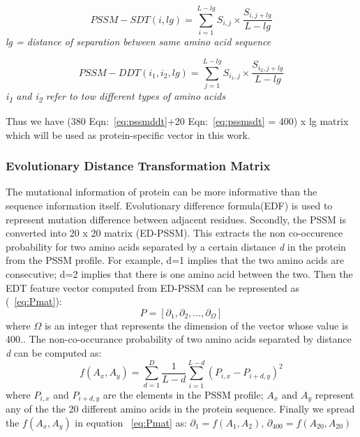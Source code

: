 \begin{equation}
  PSSM-SDT(i,lg) = \sum_{i=1}^{L-lg} S_{i,j} \times \frac{ S_{i,j+lg} }{L-lg} 
  \label{eq:pssmsdt}
\end{equation}
\textit{\center lg =  distance of separation between same amino acid sequence}

\begin{equation}
  PSSM-DDT(i_1,i_2, lg) = \sum_{j=1}^{L-lg} S_{i_1,j} \times \frac{ S_{i_2,j+lg} }{ L-lg} 
  \label{eq:pssmddt}
\end{equation}
\textit{\centering i\textsubscript{1} and i\textsubscript{2} refer to tow different types of amino acids}

Thus we have (380 Eqn:~\ref{eq:pssmddt}+20 Eqn:~\ref{eq:pssmsdt} = 400) x lg matrix which will be used as protein-specific vector in this work.

\subsubsection{Evolutionary Distance Transformation Matrix}
The mutational information of protein can be more informative than the sequence information itself\cite{Zhang2014}. Evolutionary difference formula(EDF) is used to represent mutation difference between adjacent residues. Secondly, the PSSM is converted into 20 x 20 matrix (ED-PSSM). This extracts the non co-occurence probability for two amino acids separated by a certain distance \textit{d} in the protein from the PSSM profile. For example, d=1 implies that the two amino acids are consecutive; d=2 implies that there is one amino acid between the two. Then the EDT feature vector computed from ED-PSSM can be represented as (~\ref{eq:Pmat}): 
\begin{equation}
  \label{eq:Pmat}
  P = [ \partial_1 ,\partial_2, \dots, \partial_\Omega]
\end{equation}
where $\Omega$ is an integer that represents the dimension of the vector whose value is 400.. The non-co-occurance probability of two amino acids separated by distance \textit{d} can be computed as:
\begin{equation}
  f(A_x,A_y) = \sum_{d=1}^{D} \frac{1}{L-d} \sum_{i=1}^{L-d} (P_{i,x} - P_{i+d,y})^2
  \label{eq:edt}
\end{equation}
where $P_{i,x}$ and $P_{i+d,y}$ are the elements in the PSSM profile; $A_x$ and $A_y$ represent any of the the 20 different amino acids in the protein sequence. Finally we spread the $f(A_x,A_y)$ in equation ~\ref{eq:Pmat} as:
$ \partial_1 = f(A_1,A_2) $, 
$ \partial_{400} = f(A_20, A_20) $



